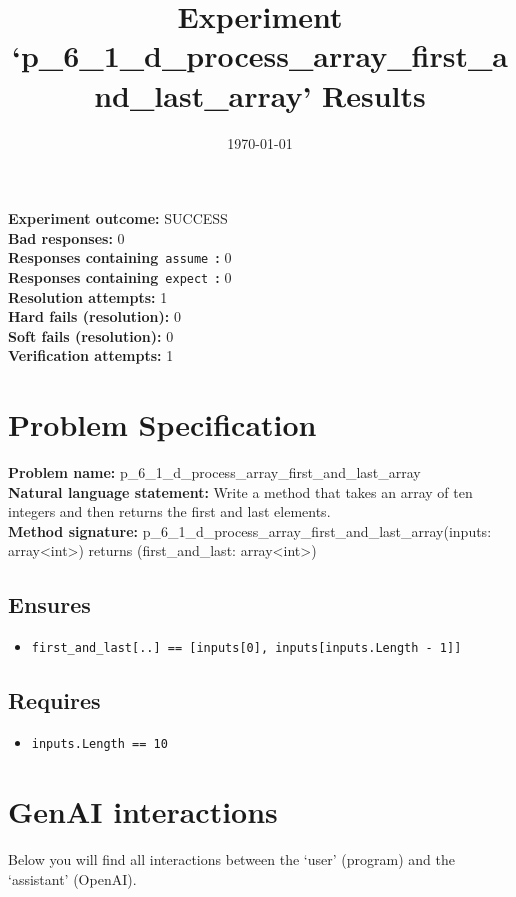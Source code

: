 \documentclass{article}
\begin{document}
\title{Experiment `p\_6\_1\_d\_process\_array\_first\_and\_last\_array' Results}
\author{\today}
\date{}
\maketitle
\textbf{Experiment outcome: }SUCCESS
\\\textbf{Bad responses: }0
\\\textbf{Responses containing}~\texttt{assume}~\textbf{: }0
\\\textbf{Responses containing}~\texttt{expect}~\textbf{: }0
\\\textbf{Resolution attempts: }1
\\\textbf{Hard fails (resolution): }0
\\\textbf{Soft fails (resolution): }0
\\\textbf{Verification attempts: }1
\section*{Problem Specification}
\textbf{Problem name: }p\_6\_1\_d\_process\_array\_first\_and\_last\_array
\\\textbf{Natural language statement: }Write a method that takes an array of ten integers and then returns the first and last elements.
\\\textbf{Method signature: }p\_6\_1\_d\_process\_array\_first\_and\_last\_array(inputs: array<int>) returns (first\_and\_last: array<int>)
\subsection*{Ensures}
\begin{itemize}
\item \texttt{first\_and\_last[..] == [inputs[0], inputs[inputs.Length - 1]]}
\end{itemize}
\subsection*{Requires}
\begin{itemize}
\item \texttt{inputs.Length == 10}
\end{itemize}
\clearpage
\section*{GenAI interactions}
Below you will find all interactions between the `user' (program) and the `assistant' (OpenAI).
\end{document}
